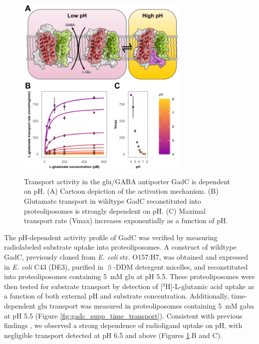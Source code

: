 \begin{figure}
\centering
\includegraphics[width=3.25in]{Figures/gadc_main_transport.pdf}
 \caption[Transport activity in the glu/GABA antiporter GadC is dependent on pH.]{Transport activity in the glu/GABA antiporter GadC is dependent on pH. (A) Cartoon depiction of the activation mechanism. (B) Glutamate transport in wildtype GadC reconstituted into proteoliposomes is strongly dependent on pH. (C) Maximal transport rate (Vmax) increases exponentially as a function of pH.}
\label{fig:gadc_main_transport}
\end{figure}
	
The pH-dependent activity profile of GadC was verified by measuring radiolabeled substrate uptake into proteoliposomes. A construct of wildtype GadC, previously cloned from \emph{E. coli} str. O157:H7, was obtained and expressed in \emph{E. coli} C43 (DE3), purified in $\mathrm{\upbeta}$-DDM detergent micelles, and reconstituted into proteoliposomes containing \SI{5}{mM} \gls{glu} at pH 5.5. These proteoliposomes were then tested for substrate transport by detection of [$\mathrm{^3H}$]-L-glutamic acid uptake as a function of both external pH and substrate concentration. Additionally, time-dependent \gls{glu} transport was measured in proteoliposomes containing \SI{5}{mM} \gls{gaba} at pH 5.5 (Figure \ref{fig:gadc_supp_time_transport}). Consistent with previous findings \citep*{Ma2013, Ma2012, Tsai2013}, we observed a strong dependence of radioligand uptake on pH, with negligible transport detected at pH 6.5 and above (Figures \ref{fig:gadc_main_transport}.B and C).

